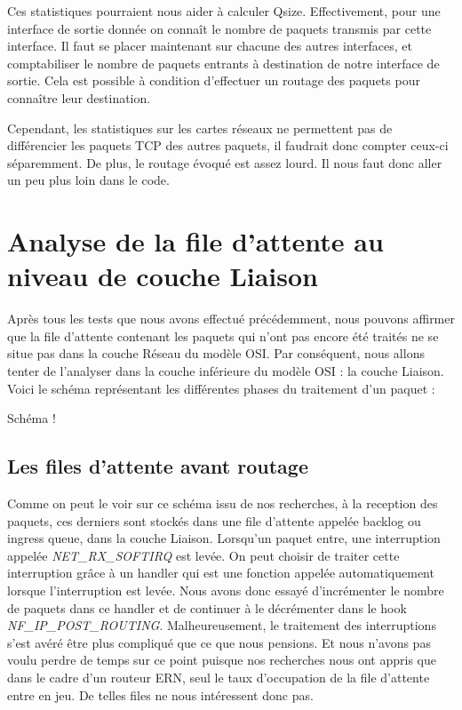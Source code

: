 \documentclass[a4paper]{article}
\begin{document}
Ces statistiques pourraient nous aider à calculer Qsize.
Effectivement, pour une interface de sortie donnée on connaît le
nombre de paquets transmis par cette interface.
Il faut se placer maintenant sur chacune des autres interfaces, et
comptabiliser le nombre de paquets entrants à destination
de notre interface de sortie. Cela est possible à condition
d'effectuer un routage des paquets pour connaître leur destination.

Cependant, les statistiques sur les cartes réseaux ne permettent pas de
différencier les paquets TCP des autres paquets, il faudrait
donc compter ceux-ci séparemment. De plus, le routage évoqué
est assez lourd. Il nous faut donc aller un peu plus loin dans le code.

\section{Analyse de la file d'attente au niveau de couche Liaison}

Après tous les tests que nous avons effectué précédemment, nous pouvons affirmer
 que la file d'attente contenant les paquets qui n'ont pas encore été traités ne
  se situe pas dans la couche Réseau du modèle 
  OSI. Par conséquent, nous allons tenter de l'analyser dans la couche
   inférieure du modèle OSI : la couche Liaison. Voici le schéma représentant
    les différentes phases du traitement d'un paquet :

Schéma !

\subsection{Les files d'attente avant routage}
Comme on peut le voir sur ce schéma issu de nos recherches, à la reception des paquets, ces derniers sont stockés dans une file d'attente appelée backlog \cite{10poin} ou ingress queue, dans la couche Liaison.
Lorsqu'un paquet entre, une interruption appelée \textit{NET\_RX\_SOFTIRQ} est levée. On peut choisir de traiter cette interruption grâce à un handler qui est une fonction appelée automatiquement lorsque l'interruption est levée. Nous avons donc essayé d'incrémenter le nombre de paquets dans ce handler et de continuer à le décrémenter  dans le hook \textit{NF\_IP\_POST\_ROUTING}. Malheureusement, le traitement des interruptions s'est avéré être plus compliqué que ce que nous pensions. Et nous n'avons pas voulu perdre de temps sur ce point puisque nos recherches nous ont appris que dans le cadre d'un routeur ERN, seul le taux d'occupation de la file d'attente entre en jeu. De telles files ne nous intéressent donc pas. 
\end{document}
